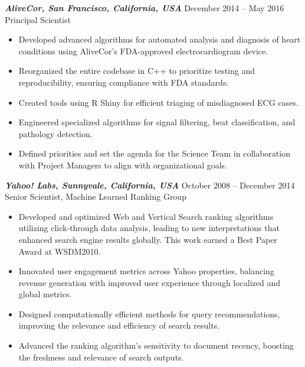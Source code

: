\documentclass[10pt]{res} %
\begin{document}
\begin{resume}
{\sl \textbf{AliveCor, San Francisco, California, USA}} \hfill December 2014 -- May 2016 \\
Principal Scientist

\vspace{8pt}

\begin{itemize}
\item Developed advanced algorithms for automated analysis and
  diagnosis of heart conditions using AliveCor's FDA-approved
  electrocardiogram device.

\item Reorganized the entire codebase in C++ to prioritize testing and
  reproducibility, ensuring compliance with FDA standards.

\item Created tools using R Shiny for efficient triaging of
  misdiagnosed ECG cases.

\item Engineered specialized algorithms for signal filtering, beat
  classification, and pathology detection.

\item Defined priorities and set the agenda for the Science Team in
  collaboration with Project Managers to align with organizational
  goals.
\end{itemize}

{\sl \textbf{Yahoo! Labs, Sunnyvale, California, USA}} \hfill October 2008 -- December 2014 \\
Senior Scientist, Machine Learned Ranking Group

\vspace{8pt} 

\begin{itemize}
\item Developed and optimized Web and Vertical Search ranking
  algorithms utilizing click-through data analysis, leading to new
  interpretations that enhanced search engine results globally. This
  work earned a Best Paper Award at WSDM2010.
  
\item Innovated user engagement metrics across Yahoo properties,
  balancing revenue generation with improved user experience through
  localized and global metrics.
  
\item Designed computationally efficient methods for query
  recommendations, improving the relevance and efficiency of search
  results.
  
\item Advanced the ranking algorithm's sensitivity to document
  recency, boosting the freshness and relevance of search outputs.
\end{itemize}


\end{resume}
\end{document}
